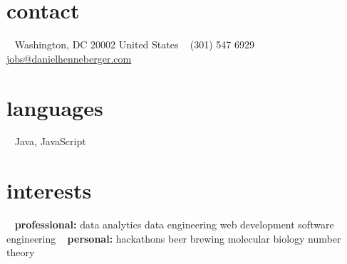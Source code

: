 \documentclass[]{friggeri-cv} %
\begin{document}


\begin{aside} %
\section{contact}
~
Washington, DC 20002
United States
~
(301) 547 6929
~
{\fontsize{8pt}{10pt}\selectfont\href{mailto:jobs@danielhenneberger.com}{jobs@danielhenneberger.com}}
\section{languages}
~
Java, JavaScript
\section{interests}
~
\textbf{professional:}
data analytics
data engineering
web development
software engineering
~
\textbf{personal:}
hackathons
beer brewing
molecular biology
number theory
\end{aside}

\end{document}
